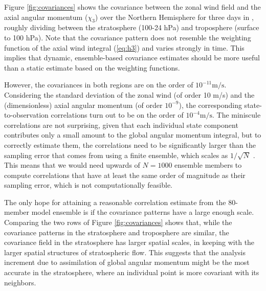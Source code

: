 Figure \ref{fig:covariances} shows the covariance between the zonal wind field and the axial angular momentum ($\chi_3$) over the Northern Hemisphere for three days in \ERPALL, roughly dividing between the 
stratosphere (100-24 hPa) 
and
troposphere (surface to 100 hPa).
Note that the covariance pattern does not resemble the weighting function of the axial wind integral (\ref{eq:h3}) 
and varies strongly in time. 
This implies that dynamic, ensemble-based covariance estimates should be more useful than a static estimate based on the weighting functions.

However, the covariances in both regions are on the order of $10^{-11}\text{m/s}$.  
Considering the standard deviation of the zonal wind (of order 10 m/s) and the (dimensionless) axial angular momentum (of order $10^{-9}$), the corresponding state-to-observation correlations turn out to be on the order of $10^{-4}\text{m/s}$. 
The miniscule correlations are not surprising, given that each individual state component contributes only a small amount to the global angular momentum integral, but to 
correctly estimate them, the correlations need to be significantly larger than the sampling error that comes from using a finite ensemble, which 
scales as $1/\sqrt{N}$ \citep{Houtekamer1998}. 
This means that we would need upwards of $N=1000$ ensemble members to compute correlations that have at least the same order of magnitude as their sampling error, which is not computationally feasible. 

The only hope for attaining a reasonable correlation estimate from the 80-member model ensemble is if the covariance patterns have a large enough scale.  
Comparing the two rows of Figure \ref{fig:covariances} shows that, while
the covariance patterns in the stratosphere and troposphere are similar, the covariance field in the stratosphere has larger spatial scales, in keeping with the larger spatial structures of stratospheric flow.
This suggests that the analysis increment due to assimilation of global angular momentum might be the most accurate in the stratosphere, where an individual point is more covariant with its neighbors.  

